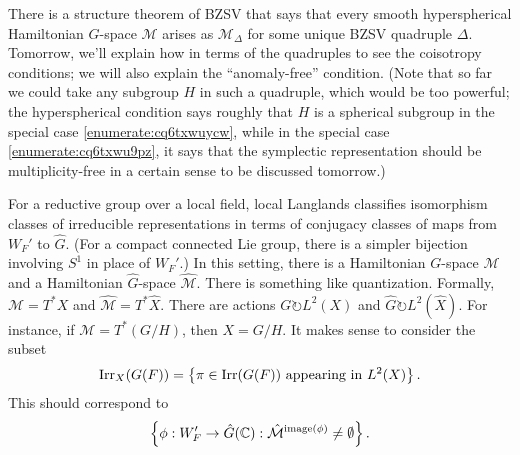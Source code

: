 \documentclass[reqno]{amsart} 
\numberwithin{theorem}{section}
\numberwithin{equation}{section}
\numberwithin{exercise}{section}
\begin{document}
There is a structure theorem of BZSV that says that every smooth hyperspherical Hamiltonian $G$-space $\mathcal{M}$ arises as $\mathcal{M}_\Delta$ for some unique BZSV quadruple $\Delta$.  Tomorrow, we'll explain how in terms of the quadruples to see the coisotropy conditions; we will also explain the ``anomaly-free'' condition.  (Note that so far we could take any subgroup $H$ in such a quadruple, which would be too powerful; the hyperspherical condition says roughly that $H$ is a spherical subgroup in the special case \eqref{enumerate:cq6txwuycw}, while in the special case \eqref{enumerate:cq6txwu9pz}, it says that the symplectic representation should be multiplicity-free in a certain sense to be discussed tomorrow.)

\begin{remark}\label{remark:cq6ueb2get}
  For a reductive group over a local field, local Langlands classifies isomorphism classes of irreducible representations in terms of conjugacy classes of maps from $W_F '$ to $\hat{G}$.  (For a compact connected Lie group, there is a simpler bijection involving $S^1$ in place of $W_F'$.)  In this setting, there is a Hamiltonian $G$-space $\mathcal{M}$ and a Hamiltonian $\hat{G}$-space $\hat{\mathcal{M}}$.  There is something like quantization.  Formally, $\mathcal{M} =T^\ast X$ and $\hat{\mathcal{M}} = T^\ast \hat{X}$.  There are actions $G \circlearrowright L^2(X)$ and $\hat{G} \circlearrowright L^2(\hat{X})$.  For instance, if $\mathcal{M} = T^\ast(G / H)$, then $X= G / H$.  It makes sense to consider the subset
  \begin{equation*}
    \operatorname{Irr}_X(G(F)) = \left\{ \pi \in \operatorname{Irr}(G(F)) \text{ appearing in } L^2(X) \right\}.
  \end{equation*}
  This should correspond to
  \begin{equation*}
    \left\{ \phi : W_F ' \rightarrow \hat{G}(\mathbb{C}) : \hat{\mathcal{M}}^{\operatorname{image}(\phi)} \neq \emptyset \right\}.
  \end{equation*}
\end{remark}
\end{document}
